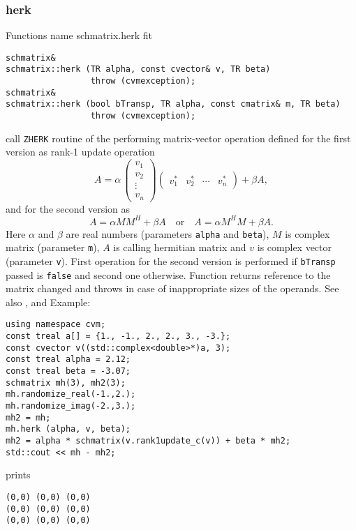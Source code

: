 \subsubsection{herk}
Functions%
\pdfdest name {schmatrix.herk} fit
\begin{verbatim}
schmatrix& 
schmatrix::herk (TR alpha, const cvector& v, TR beta) 
                 throw (cvmexception);
schmatrix& 
schmatrix::herk (bool bTransp, TR alpha, const cmatrix& m, TR beta)
                 throw (cvmexception);
\end{verbatim}
call \verb"ZHERK" routine of the
performing  matrix-vector operation defined for the first version as
rank-1 update operation
\begin{equation*}
A=\alpha\,\begin{pmatrix}
v_1 \\
v_2 \\
\vdots \\
v_n
\end{pmatrix}
\begin{pmatrix}
v_1^* & v_2^* & \cdots & v_n^*
\end{pmatrix} + \beta A,
\end{equation*}
and for the second version as
\begin{equation*}
A=\alpha MM^H + \beta A\quad\text{or}\quad A=\alpha M^HM + \beta A.
\end{equation*}
Here $\alpha$ and $\beta$ are real numbers 
(parameters \verb"alpha" and \verb"beta"),
$M$ is  complex matrix (parameter \verb"m"),
$A$ is  calling hermitian matrix
and $v$ is  complex vector (parameter \verb"v").
First operation for the second version 
is performed if \verb"bTransp" passed
is \verb"false" and second one otherwise.
Function
returns  reference to the matrix changed and throws
in case of inappropriate sizes of the operands.
See also
,
 and 
Example:
\begin{Verbatim}
using namespace cvm;
const treal a[] = {1., -1., 2., 2., 3., -3.};
const cvector v((std::complex<double>*)a, 3);
const treal alpha = 2.12;
const treal beta = -3.07;
schmatrix mh(3), mh2(3);
mh.randomize_real(-1.,2.);
mh.randomize_imag(-2.,3.);
mh2 = mh;
mh.herk (alpha, v, beta);
mh2 = alpha * schmatrix(v.rank1update_c(v)) + beta * mh2;
std::cout << mh - mh2;
\end{Verbatim}
prints
\begin{Verbatim}
(0,0) (0,0) (0,0)
(0,0) (0,0) (0,0)
(0,0) (0,0) (0,0)
\end{Verbatim}
